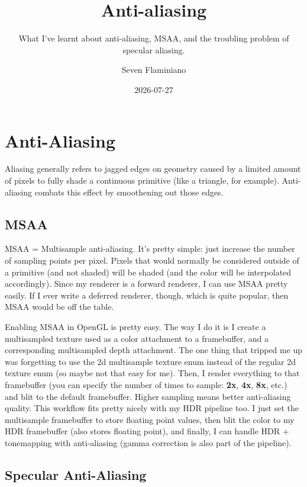 \documentclass{article}
\title{Anti-aliasing}
\subtitle{What I've learnt about anti-aliasing, MSAA, and the troubling problem of specular aliasing.}
\author{Seven Flaminiano}
\date{2026-07-27}
\begin{document}
\section{Anti-Aliasing}

Aliasing generally refers to jagged edges on geometry caused by a limited amount of pixels to fully shade a continuous primitive (like a triangle, for example). Anti-aliasing combats this effect by smoothening out those edges.

\subsection{MSAA}

MSAA = Multisample anti-aliasing. It's pretty simple: just increase the number of sampling points per pixel.
Pixels that would normally be considered outside of a primitive (and not shaded) will be shaded (and the color will be interpolated accordingly). Since my renderer is a forward renderer, I can use MSAA pretty easily. If I ever write a deferred renderer, though, which is quite popular, then MSAA would be off the table.

Enabling MSAA in OpenGL is pretty easy. The way I do it is I 
create a multisampled texture used as a color attachment to a 
framebuffer, and a corresponding multisampled depth attachment. The one 
thing that tripped me up was forgetting to use the 2d multisample texture enum instead of 
the regular 2d texture enum (so maybe not that easy for me). Then, I render everything to that framebuffer (you can specify the number of times to sample: \textbf{2x}, \textbf{4x}, \textbf{8x}, etc.) and blit to the default framebuffer. Higher sampling means better anti-aliasing quality. This workflow fits pretty nicely with my HDR pipeline too. I just set the multisample framebuffer to store floating point values, then blit the color to my HDR framebuffer (also stores floating point), 
and finally, I can handle HDR + tonemapping with anti-aliasing (gamma correction is also part of the pipeline).

\subsection{Specular Anti-Aliasing}
\end{document}
